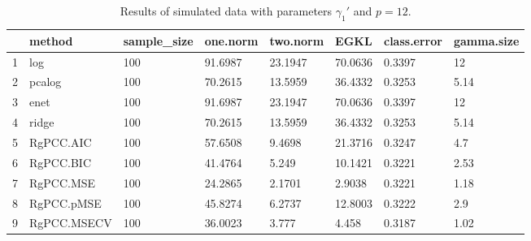 \begin{table}[ht]
\centering
\begin{tabular}{rlllllll}
  \hline
 & method & sample\_size & one.norm & two.norm & EGKL & class.error & gamma.size \\ 
  \hline
1 & log & 100 & 91.6987 & 23.1947 & 70.0636 & 0.3397 & 12 \\ 
  2 & pcalog & 100 & 70.2615 & 13.5959 & 36.4332 & 0.3253 & 5.14 \\ 
  3 & enet & 100 & 91.6987 & 23.1947 & 70.0636 & 0.3397 & 12 \\ 
  4 & ridge & 100 & 70.2615 & 13.5959 & 36.4332 & 0.3253 & 5.14 \\ 
  5 & RgPCC.AIC & 100 & 57.6508 & 9.4698 & 21.3716 & 0.3247 & 4.7 \\ 
  6 & RgPCC.BIC & 100 & 41.4764 & 5.249 & 10.1421 & 0.3221 & 2.53 \\ 
  7 & RgPCC.MSE & 100 & 24.2865 & 2.1701 & 2.9038 & 0.3221 & 1.18 \\ 
  8 & RgPCC.pMSE & 100 & 45.8274 & 6.2737 & 12.8003 & 0.3222 & 2.9 \\ 
  9 & RgPCC.MSECV & 100 & 36.0023 & 3.777 & 4.458 & 0.3187 & 1.02 \\ 
   \hline
\end{tabular}
\caption{Results of simulated data with parameters $\gamma_1'$ and $p =12$. } 
\label{fig-1'-nonlead-alt-12-metrics-p}
\end{table}
